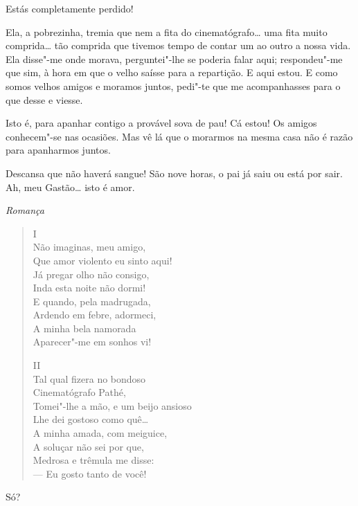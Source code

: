  Estás completamente perdido!

 Ela, a pobrezinha,
tremia que nem a fita do cinematógrafo\ldots{} uma fita
muito comprida\ldots{} tão comprida que tivemos tempo de
contar um ao outro a nossa vida. Ela disse"-me onde morava,
perguntei"-lhe se poderia falar aqui; respondeu"-me que sim, à
hora em que o velho saísse para a repartição.
E aqui estou. E como somos velhos amigos e moramos juntos,
pedi"-te que me acompanhasses para o que desse e viesse.

 Isto é,
para apanhar contigo a provável sova de pau!
Cá estou! Os amigos conhecem"-se nas
ocasiões. Mas vê lá que o morarmos
na mesma casa não é razão para apanharmos juntos.

 Descansa que
não haverá sangue! 
São nove horas, o pai já saiu ou está por
sair. Ah, meu Gastão\ldots{} isto é amor.

{\smallskip\raggedleft\itshape Romança\par}
\begin{verse}
\hspace{17mm} I\\
\smallskip
Não imaginas, meu amigo,\\
Que amor violento eu sinto aqui!\\
Já pregar olho não consigo, \\
Inda esta noite não dormi! \\
E quando, pela madrugada, \\
Ardendo em febre, adormeci, \\
A minha bela namorada \\
Aparecer"-me em sonhos vi!

\hspace{17mm} II\\
\smallskip
Tal qual fizera no bondoso \\
Cinematógrafo Pathé, \\
Tomei"-lhe a mão, e um beijo ansioso\\
Lhe dei gostoso como quê\ldots{}\\
A minha amada, com meiguice, \\
A soluçar não sei por que, \\
Medrosa e trêmula me disse: \\
--- Eu gosto tanto de você!
\end{verse}



 Só? 

